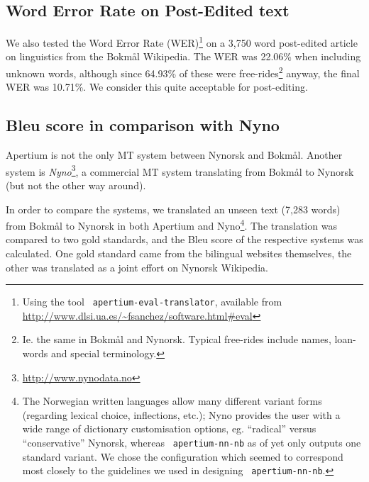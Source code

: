 \documentclass[11pt]{article}
\newcommand{\comment}[1]{\textbf{SKRIV} {\it #1}}
\renewcommand{\comment}[1]{}
\begin{document}
\subsection{Word Error Rate on Post-Edited text}
\label{sec:WER}
We also tested the Word Error Rate (WER)\footnote{Using the tool {\tt
apertium-eval-translator}, available from
\href{http://www.dlsi.ua.es/~fsanchez/software.html\#eval}{http://www.dlsi.ua.es/\~{}fsanchez/software.html\#eval}}
on a 3,750 word post-edited article on linguistics from the Bokmål
Wikipedia. The WER was 22.06\% when including unknown words, although
since 64.93\% of these were free-rides\footnote{Ie. the same
in Bokmål and Nynorsk. Typical free-rides include names, loan-words
and special terminology.} anyway, the final WER was 10.71\%. We
consider this quite acceptable for post-editing.

\comment{ {\tt apertium-nn-nb} may thus be used for dissemination (is
there a citation somewhere s.t. we may say ``$<15\%$ means we spend less
time post-editing than translating from scratch''?)}

\comment{ we should update this WER on the bleu-text, 10.71\%
does seem too good to be true / generalisable}

\subsection{{\sc Bleu} score in comparison with Nyno}

Apertium is not the only MT system between Nynorsk and Bokmål. Another
system is
\textit{Nyno}\footnote{\href{http://www.nynodata.no}{http://www.nynodata.no}},
a commercial MT system translating from Bokmål to Nynorsk (but not the
other way around). 

In order to compare the systems, we translated an unseen text (7,283
words) from Bokmål to Nynorsk in both Apertium and Nyno\footnote{The
  Norwegian written languages allow many different variant forms
  (regarding lexical choice, inflections, etc.); Nyno provides the
  user with a wide range of dictionary customisation options,
  eg. ``radical'' versus ``conservative'' Nynorsk, whereas {\tt
    apertium-nn-nb} as of yet only outputs one standard variant. We
  chose the \comment{standard/XYZ-}configuration which seemed to
  correspond most closely to the guidelines we used in designing {\tt
    apertium-nn-nb}.}. The translation was compared to two gold
standards, and the {\sc Bleu} score \citep{papineni2001bleu} of the
respective systems was calculated. One gold standard came from the
bilingual websites themselves, the other was translated as a joint 
effort on Nynorsk Wikipedia.
\end{document}
